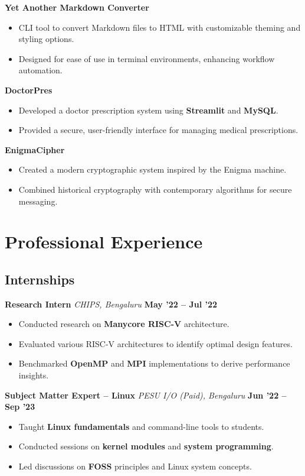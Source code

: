 \documentclass[a4paper,10pt]{article}
\begin{document}
\textbf{Yet Another Markdown Converter}
\begin{itemize}
    \item CLI tool to convert Markdown files to HTML with customizable theming and styling options.
    \item Designed for ease of use in terminal environments, enhancing workflow automation.
\end{itemize}

\textbf{DoctorPres}
\begin{itemize}
    \item Developed a doctor prescription system using \textbf{Streamlit} and \textbf{MySQL}.
    \item Provided a secure, user-friendly interface for managing medical prescriptions.
\end{itemize}

\textbf{EnigmaCipher}
\begin{itemize}
    \item Created a modern cryptographic system inspired by the Enigma machine.
    \item Combined historical cryptography with contemporary algorithms for secure messaging.
\end{itemize}

\section*{Professional Experience}

\subsection*{Internships}

\textbf{Research Intern} \hfill
\textit{CHIPS, Bengaluru} \hfill \textbf{May '22 -- Jul '22}
\begin{itemize}
    \item Conducted research on \textbf{Manycore RISC-V} architecture.
    \item Evaluated various RISC-V architectures to identify optimal design features.
    \item Benchmarked \textbf{OpenMP} and \textbf{MPI} implementations to derive performance insights.
\end{itemize}

\vspace{0.5em}

\textbf{Subject Matter Expert -- Linux} \hfill
\textit{PESU I/O (Paid), Bengaluru} \hfill \textbf{Jun '22 -- Sep '23}
\begin{itemize}
    \item Taught \textbf{Linux fundamentals} and command-line tools to students.
    \item Conducted sessions on \textbf{kernel modules} and \textbf{system programming}.
    \item Led discussions on \textbf{FOSS} principles and Linux system concepts.
\end{itemize}
\end{document}
